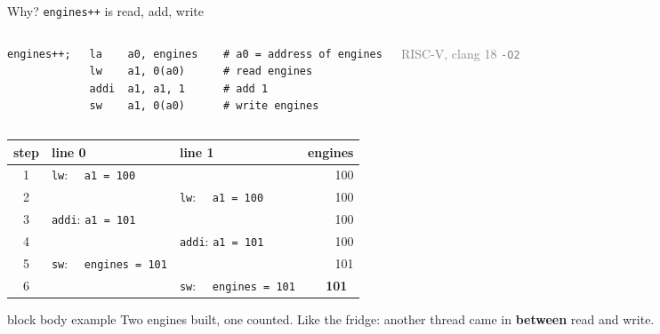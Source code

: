 \documentclass[aspectratio=169,10pt]{beamer}
\newcommand{\nok}{\textcolor{aWrite}{\faTimes}}
\newcommand{\keymsg}[1]{%
  \begin{beamercolorbox}[rounded=true,sep=0.1cm,wd=\textwidth]{block body example}
    \centering\footnotesize #1
  \end{beamercolorbox}}
\begin{document}
\begin{frame}[fragile]{Why? \texttt{engines++} is read, add, write}
  \begin{columns}[c,onlytextwidth]
\begin{lstlisting}[style=cpp]
engines++;
\end{lstlisting}
      \centering{\Large\textcolor{DeepBlue}{$\Rightarrow$}}
\begin{lstlisting}[style=rv]
la    a0, engines    # a0 = address of engines
lw    a1, 0(a0)      # read engines
addi  a1, a1, 1      # add 1
sw    a1, 0(a0)      # write engines
\end{lstlisting}
      {\hfill\tiny\textcolor{gray}{RISC-V, clang 18 \texttt{-O2}}}
  \end{columns}
  \begin{center}
    \footnotesize
    \renewcommand{\arraystretch}{0.95}
    \begin{tabular}{c l l r}
      \toprule
      \textbf{step} & \textbf{line 0} & \textbf{line 1} & \textbf{engines} \\
      \midrule
      1 & \texttt{lw}: \ \ \texttt{a1 = 100} & & 100 \\
      2 & & \texttt{lw}: \ \ \texttt{a1 = 100} & 100 \\
      3 & \texttt{addi}: \texttt{a1 = 101} & & 100 \\
      4 & & \texttt{addi}: \texttt{a1 = 101} & 100 \\
      5 & \texttt{sw}: \ \ \texttt{engines = 101} & & 101 \\
      \rowcolor{AccentOrange!12}
      6 & & \texttt{sw}: \ \ \texttt{engines = 101} & \textbf{101}\ \nok \\
      \bottomrule
    \end{tabular}
  \end{center}
  \vfill
  \keymsg{Two engines built, one counted. Like the fridge: another thread came in \textbf{between} read and write.}
\end{frame}
\end{document}
